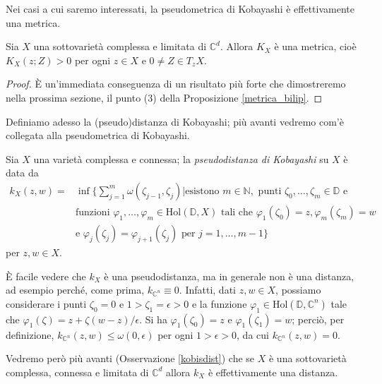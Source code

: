Nei casi a cui saremo interessati, la pseudometrica di Kobayashi è effettivamente una metrica.

\begin{prop}
    Sia $X$ una sottovarietà complessa e limitata di $\mathbb{C}^d$. Allora $K_X$ è una metrica, cioè $K_X(z;Z)>0$ per ogni $z\in X$ e $0\not=Z\in T_zX$.
\end{prop}

\begin{proof}
    È un'immediata conseguenza di un risultato più forte che dimostreremo nella prossima sezione, il punto (3) della Proposizione \ref{metrica_bilip}.
\end{proof}

Definiamo adesso la (pseudo)distanza di Kobayashi; più avanti vedremo com'è collegata alla pseudometrica di Kobayashi.

\begin{defn}
    Sia $X$ una varietà complessa e connessa; la \textit{pseudodistanza di Kobayashi} su $X$ è data da
    \begin{equation}\begin{split}
        k_X(z,w)=&\inf\Bigg\{\sum_{j=1}^m \omega(\zeta_{j-1},\zeta_j) \bigg\vert \text{esistono }m\in\mathbb{N},\text{ punti }\zeta_0,\dots,\zeta_m \in \mathbb{D}\text{ e}\\
        &\text{funzioni }\varphi_1,\dots,\varphi_m\in\text{Hol}(\mathbb{D},X) \text{ tali che } \varphi_1(\zeta_0)=z,\varphi_m(\zeta_m)=w\\
        &\text{e }\varphi_j(\zeta_j)=\varphi_{j+1}(\zeta_j)\text{ per }j=1,\dots,m-1\Bigg\}
    \end{split}\end{equation}
    per $z,w \in X$.
\end{defn}

\begin{oss} \label{k_lip}
    È facile vedere che $k_X$ è una pseudodistanza, ma in generale non è una distanza, ad esempio perché, come prima, $k_{\mathbb{C}^n}\equiv 0$. Infatti, dati $z,w\in X$, possiamo considerare i punti $\zeta_0=0$ e $1>\zeta_1=\epsilon>0$ e la funzione $\varphi_1\in\text{Hol}(\mathbb{D},\mathbb{C}^n)$ tale che $\varphi_1(\zeta)=z+\zeta(w-z)/\epsilon$. Si ha $\varphi_1(\zeta_0)=z$ e $\varphi_1(\zeta_1)=w$; perciò, per definizione, $k_{\mathbb{C}^n}(z,w) \le \omega(0,\epsilon)$ per ogni $1>\epsilon>0$, da cui $k_{\mathbb{C}^n}(z,w)=0$.
    
    Vedremo però più avanti (Osservazione \ref{kobisdist}) che se $X$ è una sottovarietà complessa, connessa e limitata di $\mathbb{C}^d$ allora $k_X$ è effettivamente una distanza.
\end{oss}

